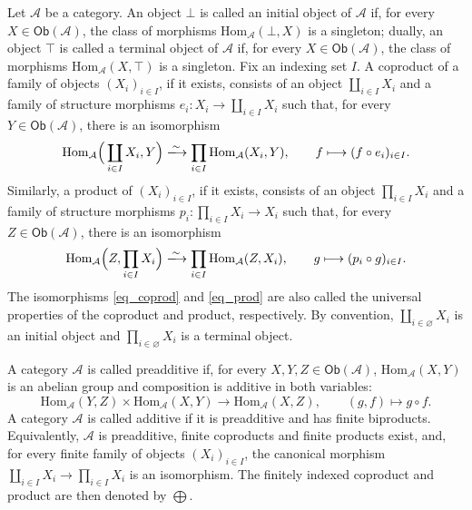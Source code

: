 \documentclass[10pt,a4paper]{amsart}
\theoremstyle{plain}
\theoremstyle{definition}
\theoremstyle{remark}
\begin{document}
Let $\mathcal{A}$ be a category.
An object $\bot$ is called an initial object of $\mathcal{A}$ if, for every $X \in \mathsf{Ob}(\mathcal{A})$, the class of morphisms $\mathrm{Hom}_\mathcal{A}(\bot, X)$ is a singleton; dually, an object $\top$ is called a terminal object of $\mathcal{A}$ if, for every $X \in \mathsf{Ob}(\mathcal{A})$, the class of morphisms $\mathrm{Hom}_\mathcal{A}(X, \top)$ is a singleton.
Fix an indexing set $I$.
A coproduct of a family of objects $(X_i)_{i \in I}$, if it exists, consists of an object $\coprod_{i \in I} X_i$ and a family of structure morphisms $e_i : X_i \longrightarrow \coprod_{i \in I} X_i$ such that, for every $Y \in \mathsf{Ob}(\mathcal{A})$, there is an isomorphism
\begin{equation}\label{eq_coprod}
  \mathrm{Hom}_\mathcal{A}\Big(\coprod_{i \in I} X_i, Y\Big) \xlongrightarrow{\sim} \prod_{i \in I} \mathrm{Hom}_\mathcal{A}(X_i, Y),\qquad f \longmapsto (f \circ e_i)_{i \in I}.
\end{equation}
Similarly, a product of $(X_i)_{i \in I}$, if it exists, consists of an object $\prod_{i \in I} X_i$ and a family of structure morphisms $p_i : \prod_{i \in I} X_i \longrightarrow  X_i$ such that, for every $Z \in \mathsf{Ob}(\mathcal{A})$, there is an isomorphism
\begin{equation}\label{eq_prod}
  \mathrm{Hom}_\mathcal{A}\Big(Z, \prod_{i \in I} X_i\Big) \xlongrightarrow{\sim} \prod_{i \in I} \mathrm{Hom}_\mathcal{A}(Z, X_i),\qquad g \longmapsto (p_i \circ g)_{i \in I}.
\end{equation}
The isomorphisms \eqref{eq_coprod} and \eqref{eq_prod} are also called the universal properties of the coproduct and product, respectively.
By convention, $\coprod_{i \in \varnothing} X_i$ is an initial object and $\prod_{i \in \varnothing} X_i$ is a terminal object.

\medskip

A category $\mathcal{A}$ is called preadditive if, for every $X,Y,Z \in \mathsf{Ob}(\mathcal{A})$, $\mathrm{Hom}_\mathcal{A}(X,Y)$ is an abelian group and composition is additive in both variables:
\[
  \mathrm{Hom}_\mathcal{A}(Y,Z) \times \mathrm{Hom}_\mathcal{A}(X,Y) \longrightarrow \mathrm{Hom}_\mathcal{A}(X,Z),\qquad (g,f) \longmapsto g \circ f.
\]
A category $\mathcal{A}$ is called additive if it is preadditive and has finite biproducts.
Equivalently, $\mathcal A$ is preadditive, finite coproducts and finite products exist, and, for every finite family of objects $(X_i)_{i \in I}$, the canonical morphism $\coprod_{i \in I}X_i\longrightarrow\prod_{i \in I}X_i$ is an isomorphism.
The finitely indexed coproduct and product are then denoted by $\bigoplus$.
\end{document}
